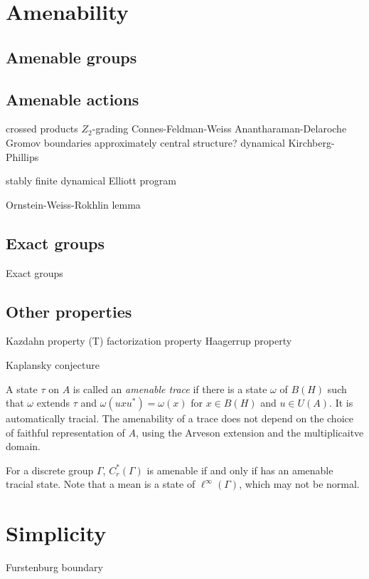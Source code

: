\documentclass{../../large}
\begin{document}
\chapter{Amenability}


\section{Amenable groups}


\section{Amenable actions}
crossed products
$Z_2$-grading
Connes-Feldman-Weiss
Anantharaman-Delaroche
Gromov boundaries
approximately central structure?
dynamical Kirchberg-Phillips

stably finite
dynamical Elliott program

Ornstein-Weiss-Rokhlin lemma

\section{Exact groups}
Exact groups

\section{Other properties}
Kazdahn property (T)
factorization property
Haagerrup property


Kaplansky conjecture




A state $\tau$ on $A$ is called an \emph{amenable trace} if there is a state $\omega$ of $B(H)$ such that $\omega$ extends $\tau$ and $\omega(uxu^*)=\omega(x)$ for $x\in B(H)$ and $u\in U(A)$.
It is automatically tracial.
The amenability of a trace does not depend on the choice of faithful representation of $A$, using the Arveson extension and the multiplicaitve domain.

For a discrete group $\Gamma$, $C^*_r(\Gamma)$ is amenable if and only if has an amenable tracial state.
Note that a mean is a state of $\ell^\infty(\Gamma)$, which may not be normal.





\chapter{Simplicity}


Furstenburg boundary
\end{document}

